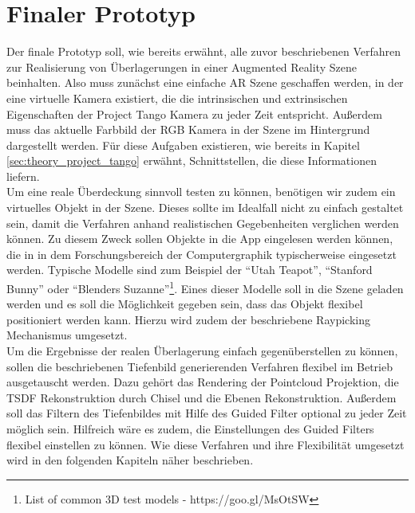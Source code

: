 \section{Finaler Prototyp} \label{sec:final_prototype}

Der finale Prototyp soll, wie bereits erwähnt, alle zuvor beschriebenen Verfahren zur Realisierung von Überlagerungen in einer Augmented Reality Szene beinhalten. Also muss zunächst eine einfache AR Szene geschaffen werden, in der eine virtuelle Kamera existiert, die die intrinsischen und extrinsischen Eigenschaften der Project Tango Kamera zu jeder Zeit entspricht. Außerdem muss das aktuelle Farbbild der RGB Kamera in der Szene im Hintergrund dargestellt werden. Für diese Aufgaben existieren, wie bereits in Kapitel \ref{sec:theory_project_tango} erwähnt, Schnittstellen, die diese Informationen liefern. \\

Um eine reale Überdeckung sinnvoll testen zu können, benötigen wir zudem ein virtuelles Objekt in der Szene. Dieses sollte im Idealfall nicht zu einfach gestaltet sein, damit die Verfahren anhand realistischen Gegebenheiten verglichen werden können. Zu diesem Zweck sollen Objekte in die App eingelesen werden können, die in in dem Forschungsbereich der Computergraphik typischerweise eingesetzt werden. Typische Modelle sind zum Beispiel der \enquote{Utah Teapot}, \enquote{Stanford Bunny} oder \enquote{Blenders Suzanne}\footnote{List of common 3D test models - https://goo.gl/MsOtSW}.  Eines dieser Modelle soll in die Szene geladen werden und es soll die Möglichkeit gegeben sein, dass das Objekt flexibel positioniert werden kann. Hierzu wird zudem der beschriebene Raypicking Mechanismus umgesetzt.\\

Um die Ergebnisse der  realen Überlagerung einfach gegenüberstellen zu können, sollen die beschriebenen Tiefenbild generierenden Verfahren flexibel im Betrieb ausgetauscht werden. Dazu gehört das Rendering der Pointcloud Projektion, die TSDF Rekonstruktion durch Chisel und die Ebenen Rekonstruktion. Außerdem soll das Filtern des Tiefenbildes mit Hilfe des Guided Filter optional zu jeder Zeit möglich sein. Hilfreich wäre es zudem, die Einstellungen des Guided Filters flexibel einstellen zu können. Wie diese Verfahren und ihre Flexibilität umgesetzt wird in den folgenden Kapiteln näher beschrieben.